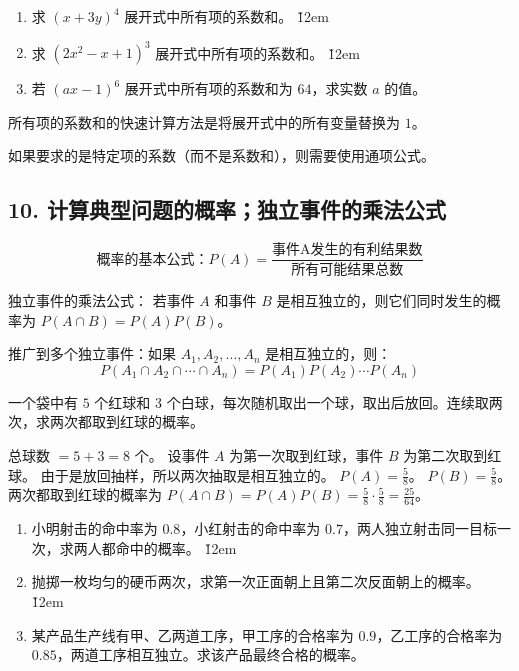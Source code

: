 \begin{problem}
\begin{enumerate}
    \item 求 $(x + 3y)^4$ 展开式中所有项的系数和。
          \v{12em}
    \item 求 $(2x^2 - x + 1)^3$ 展开式中所有项的系数和。
          \v{12em}
    \item 若 $(ax - 1)^6$ 展开式中所有项的系数和为 $64$，求实数 $a$ 的值。
\end{enumerate}
\end{problem}
\begin{tips}
    所有项的系数和的快速计算方法是将展开式中的所有变量替换为 $1$。
\end{tips}
\begin{warning}
    如果要求的是特定项的系数（而不是系数和），则需要使用通项公式。
\end{warning}

\subsection*{10. 计算典型问题的概率；独立事件的乘法公式}

\begin{theorem}
    $$\text{概率的基本公式：} P(A) = \frac{\text{事件A发生的有利结果数}}{\text{所有可能结果总数}}$$

    独立事件的乘法公式： 若事件 $A$ 和事件 $B$ 是相互独立的，则它们同时发生的概率为 $P(A \cap B) = P(A)P(B)$。

    推广到多个独立事件：如果 $A_1, A_2, \ldots, A_n$ 是相互独立的，则：
    $$P(A_1 \cap A_2 \cap \cdots \cap A_n) = P(A_1)P(A_2)\cdots P(A_n)$$
\end{theorem}

\begin{example}
    一个袋中有 $5$ 个红球和 $3$ 个白球，每次随机取出一个球，取出后放回。连续取两次，求两次都取到红球的概率。
\end{example}
\begin{solution}
    总球数 $= 5+3 = 8$ 个。
    设事件 $A$ 为第一次取到红球，事件 $B$ 为第二次取到红球。
    由于是放回抽样，所以两次抽取是相互独立的。
    $P(A) = \frac{5}{8}$。
    $P(B) = \frac{5}{8}$。
    两次都取到红球的概率为 $P(A \cap B) = P(A)P(B) = \frac{5}{8} \cdot \frac{5}{8} = \frac{25}{64}$。
\end{solution}

\begin{problem}
\begin{enumerate}
    \item 小明射击的命中率为 $0.8$，小红射击的命中率为 $0.7$，两人独立射击同一目标一次，求两人都命中的概率。
          \v{12em}
    \item 抛掷一枚均匀的硬币两次，求第一次正面朝上且第二次反面朝上的概率。
          \v{12em}
    \item 某产品生产线有甲、乙两道工序，甲工序的合格率为 $0.9$，乙工序的合格率为 $0.85$，两道工序相互独立。求该产品最终合格的概率。
\end{enumerate}
\end{problem}

